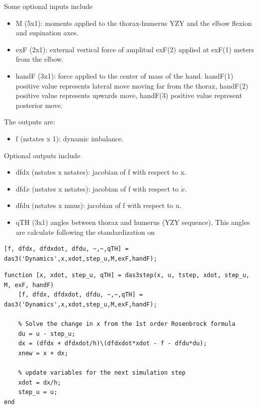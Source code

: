 Some optional inputs include
\begin{itemize}
    \item M (5x1): moments applied to the thorax-humerus YZY and the elbow flexion and supination axes.
    \item exF (2x1): external vertical force of amplitud exF(2) applied at exF(1) meters from the elbow.
    \item handF (3x1): force applied to the center of mass of the hand. handF(1) positive value represents lateral move moving far from the thorax, handF(2) positive value represents upwards move, handF(3) positive value represent posterior move.
\end{itemize}

The outputs are:

\begin{itemize}
    \item f (nstates x 1): dynamic imbalance.
\end{itemize}

Optional outputs include
\begin{itemize}
    \item dfdx (nstates x nstates): jacobian of f with respect to x.
    \item dfd$\dot{x}$ (nstates x nstates): jacobian of f with respect to $\dot{x}$.
    \item dfdu (nstates x nmus): jacobian of f with respect to u.
    \item qTH (3x1) angles between thorax and humerus (YZY sequence). This angles are calculate following the standardization on \cite{ISB}
\end{itemize}
\begin{lstlisting}
[f, dfdx, dfdxdot, dfdu, ~,~,qTH] = das3('Dynamics',x,xdot,step_u,M,exF,handF);
\end{lstlisting}




\begin{lstlisting}
function [x, xdot, step_u, qTH] = das3step(x, u, tstep, xdot, step_u, M, exF, handF)
    [f, dfdx, dfdxdot, dfdu, ~,~,qTH] = das3('Dynamics',x,xdot,step_u,M,exF,handF);
    
	% Solve the change in x from the 1st order Rosenbrock formula
	du = u - step_u;
	dx = (dfdx + dfdxdot/h)\(dfdxdot*xdot - f - dfdu*du);
	xnew = x + dx;
	
	% update variables for the next simulation step
	xdot = dx/h;
	step_u = u;
end
\end{lstlisting}


